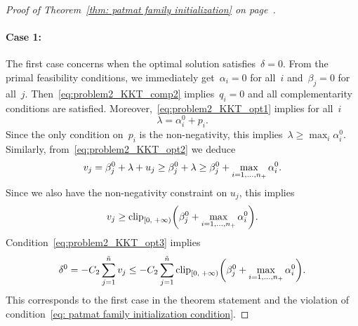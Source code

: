 \begin{proof}[Proof of Theorem~\ref{thm: patmat family initialization} on page~\pageref{thm: patmat family initialization}]
  \paragraph*{Case 1:} The first case concerns when the optimal solution satisfies~$\delta=0$. From the primal feasibility conditions, we immediately get~$\alpha_i = 0$ for all~$i$ and~$\beta_j = 0$ for all~$j$. Then~\eqref{eq:problem2_KKT_comp2} implies~$q_i=0$ and all complementarity conditions are satisfied. Moreover,~\eqref{eq:problem2_KKT_opt1} implies for all~$i$
  \begin{equation*}
    \lambda = \alpha_i^0 + p_i.
  \end{equation*}
  Since the only condition on~$p_i$ is the non-negativity, this implies~$\lambda \ge \max_i \alpha_i^0$. Similarly, from~\eqref{eq:problem2_KKT_opt2} we deduce
  \begin{equation*}
    v_j
      = \beta_j^0 +\lambda + u_j
      \ge \beta_j^0 + \lambda
      \ge \beta_j^0 + \max_{i=1,\dots,n_{+}} \alpha_i^0.
  \end{equation*}
  Since we also have the non-negativity constraint on $u_j$, this implies
  \begin{equation*}
    v_j \ge \clip[u]{0}{+\infty}{\beta_j^0 + \max_{i=1,\dots,\npos} \alpha_i^0}.
  \end{equation*}
  Condition~\eqref{eq:problem2_KKT_opt3} implies
  \begin{equation*}
    \delta^0
      = -C_2 \sum_{j = 1}^{\ntil} v_j
      \le -C_2 \sum_{j = 1}^{\ntil} \clip[u]{0}{+\infty}{\beta_j^0 + \max_{i=1,\dots,\npos} \alpha_i^0}.
  \end{equation*}
  This corresponds to the first case in the theorem statement and the violation of condition~\eqref{eq: patmat family initialization condition}.


\end{proof}
